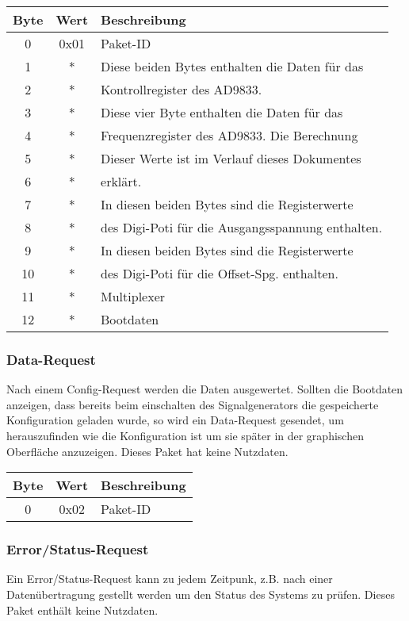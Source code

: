 \begin{flushleft}
\begin{tabular}{c||c|l}
Byte & Wert & Beschreibung \\
\hline
\hline
0 & 0x01 & Paket-ID \\
\hline
1 & * & Diese beiden Bytes enthalten die Daten für das \\
2 & * & Kontrollregister des AD9833.\\
\hline
3 & * & Diese vier Byte enthalten die Daten für das \\
4 & * & Frequenzregister des AD9833. Die Berechnung \\
5 & * & Dieser Werte ist im Verlauf dieses Dokumentes \\
6 & * & erklärt.\\
\hline
7 & * & In diesen beiden Bytes sind die Registerwerte \\
8 & * & des Digi-Poti für die Ausgangsspannung enthalten.\\
\hline
9 & * & In diesen beiden Bytes sind die Registerwerte \\
10 & * & des Digi-Poti für die Offset-Spg. enthalten.\\
\hline
11 & * & Multiplexer\\
\hline
12 & * & Bootdaten\\

\end{tabular}
\end{flushleft}

\subsubsection{Data-Request}
Nach einem Config-Request werden die Daten ausgewertet. Sollten die Bootdaten anzeigen, dass bereits beim einschalten des Signalgenerators die gespeicherte Konfiguration geladen wurde, so wird ein Data-Request gesendet, um herauszufinden wie die Konfiguration ist um sie später in der graphischen Oberfläche anzuzeigen. Dieses Paket hat keine Nutzdaten.
\begin{flushleft}
\begin{tabular}{c||c|l}
Byte & Wert & Beschreibung \\
\hline
\hline
0 & 0x02 & Paket-ID \\

\end{tabular}
\end{flushleft}

\pagebreak
\subsubsection{Error/Status-Request}
Ein Error/Status-Request kann zu jedem Zeitpunk, z.B. nach einer Datenübertragung gestellt werden um den Status des Systems zu prüfen. Dieses Paket enthält keine Nutzdaten.

